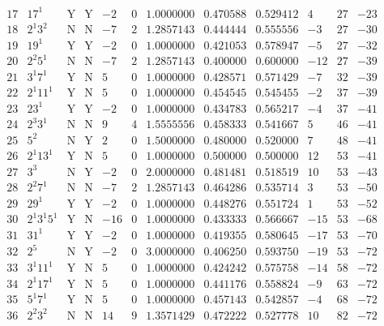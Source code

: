 \documentclass[11pt,reqno,a4letter]{article}
\numberwithin{figure}{section}
\numberwithin{table}{section}
\theoremstyle{plain}
\numberwithin{theorem}{section}
\theoremstyle{definition}
\begin{document}
\begin{table}[ht!]
\begin{equation*}
{\begin{array}{cc|cc|ccc|cc|ccc}
 17 & 17^1 & \text{Y} & \text{Y} & -2 & 0 & 1.0000000 & 0.470588 & 0.529412 & 4 & 27 & -23 \\
 18 & 2^1 3^2 & \text{N} & \text{N} & -7 & 2 & 1.2857143 & 0.444444 & 0.555556 & -3 & 27 & -30 \\
 19 & 19^1 & \text{Y} & \text{Y} & -2 & 0 & 1.0000000 & 0.421053 & 0.578947 & -5 & 27 & -32 \\
 20 & 2^2 5^1 & \text{N} & \text{N} & -7 & 2 & 1.2857143 & 0.400000 & 0.600000 & -12 & 27 & -39 \\
 21 & 3^1 7^1 & \text{Y} & \text{N} & 5 & 0 & 1.0000000 & 0.428571 & 0.571429 & -7 & 32 & -39 \\
 22 & 2^1 11^1 & \text{Y} & \text{N} & 5 & 0 & 1.0000000 & 0.454545 & 0.545455 & -2 & 37 & -39 \\
 23 & 23^1 & \text{Y} & \text{Y} & -2 & 0 & 1.0000000 & 0.434783 & 0.565217 & -4 & 37 & -41 \\
 24 & 2^3 3^1 & \text{N} & \text{N} & 9 & 4 & 1.5555556 & 0.458333 & 0.541667 & 5 & 46 & -41 \\
 25 & 5^2 & \text{N} & \text{Y} & 2 & 0 & 1.5000000 & 0.480000 & 0.520000 & 7 & 48 & -41 \\
 26 & 2^1 13^1 & \text{Y} & \text{N} & 5 & 0 & 1.0000000 & 0.500000 & 0.500000 & 12 & 53 & -41 \\
 27 & 3^3 & \text{N} & \text{Y} & -2 & 0 & 2.0000000 & 0.481481 & 0.518519 & 10 & 53 & -43 \\
 28 & 2^2 7^1 & \text{N} & \text{N} & -7 & 2 & 1.2857143 & 0.464286 & 0.535714 & 3 & 53 & -50 \\
 29 & 29^1 & \text{Y} & \text{Y} & -2 & 0 & 1.0000000 & 0.448276 & 0.551724 & 1 & 53 & -52 \\
 30 & 2^1 3^1 5^1 & \text{Y} & \text{N} & -16 & 0 & 1.0000000 & 0.433333 & 0.566667 & -15 & 53 & -68 \\
 31 & 31^1 & \text{Y} & \text{Y} & -2 & 0 & 1.0000000 & 0.419355 & 0.580645 & -17 & 53 & -70 \\
 32 & 2^5 & \text{N} & \text{Y} & -2 & 0 & 3.0000000 & 0.406250 & 0.593750 & -19 & 53 & -72 \\
 33 & 3^1 11^1 & \text{Y} & \text{N} & 5 & 0 & 1.0000000 & 0.424242 & 0.575758 & -14 & 58 & -72 \\
 34 & 2^1 17^1 & \text{Y} & \text{N} & 5 & 0 & 1.0000000 & 0.441176 & 0.558824 & -9 & 63 & -72 \\
 35 & 5^1 7^1 & \text{Y} & \text{N} & 5 & 0 & 1.0000000 & 0.457143 & 0.542857 & -4 & 68 & -72 \\
 36 & 2^2 3^2 & \text{N} & \text{N} & 14 & 9 & 1.3571429 & 0.472222 & 0.527778 & 10 & 82 & -72 \\

\end{array}}
\end{equation*}
\end{table}
\end{document}
